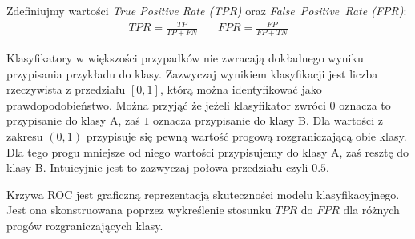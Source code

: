 \documentclass[a4paper, twoside, 11pt, openright]{article}
\begin{document}
Zdefiniujmy wartości \textit{True Positive Rate (TPR)} oraz \textit{False\ Positive\ Rate (FPR)}:
\begin{align*}
 TPR = \frac{TP}{TP+FN}\ \ \ \ \ \ \ \ FPR = \frac{FP}{FP+TN} 
\end{align*}

Klasyfikatory w większości przypadków nie zwracają dokładnego wyniku przypisania przykładu do klasy. Zazwyczaj wynikiem klasyfikacji jest liczba rzeczywista z przedziału $[0, 1]$, którą można identyfikować jako prawdopodobieństwo. Można przyjąć że jeżeli klasyfikator zwróci $0$ oznacza to przypisanie do klasy A, zaś $1$ oznacza przypisanie do klasy B. Dla wartości z zakresu $(0, 1)$ przypisuje się pewną wartość progową rozgraniczającą obie klasy. Dla tego progu mniejsze od niego wartości przypisujemy do klasy A, zaś resztę do klasy B. Intuicyjnie jest to zazwyczaj połowa przedziału czyli $0.5$.

Krzywa ROC jest graficzną reprezentacją skuteczności modelu klasyfikacyjnego. Jest ona skonstruowana poprzez wykreślenie stosunku $TPR$ do $FPR$ dla różnych progów rozgraniczających klasy.
\end{document}
